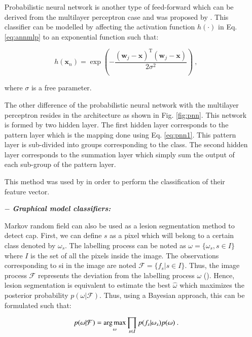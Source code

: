 \begin{enumerate}[leftmargin=*]
Probabilistic neural network is another type of feed-forward which can be derived from the multilayer perceptron case and was proposed by \cite{Specht1988}. This classifier can be modelled by affecting the activation function $h(\cdot)$ in Eq. \eqref{eq:annmlp} to an exponential function such that:

\begin{equation}
	h(\mathbf{x}_n) = \exp \left( - \frac{ (\mathbf{w}_j - \mathbf{x})^{\text{T}}(\mathbf{w}_j - \mathbf{x}) }{2\sigma^2} \right) \ ,
	\label{eq:pnn1}
\end{equation}

\noindent where $\sigma$ is a free parameter.

The other difference of the probabilistic neural network with the multilayer perceptron resides in the architecture as shown in Fig. \ref{fig:pnn}. This network is formed by two hidden layer. The first hidden layer corresponds to the pattern layer which is the mapping done using Eq. \eqref{eq:pnn1}. This pattern layer is sub-divided into groups corresponding to the class. The second hidden layer corresponds to the summation layer which simply sum the output of each sub-group of the pattern layer.

This method was used  by \cite{Ampeliotis2007,Ampeliotis2008,Viswanath2011} in order to perform the classification of their feature vector.

\item[$-$] \textbf{\textit{Graphical model classifiers:}}

Markov random field can also be used as a lesion segmentation method to detect \ac{cap}. First, we can define $s$ as a pixel which will belong to a certain class denoted by $\omega_s$. The labelling process can be noted as $\omega = \{\omega_s, s \in I\}$ where $I$ is the set of all the pixels inside the image. The observations corresponding to \ac{si} in the image are noted $\mathcal{F} = \{ f_s | s \in I \}$. Thus, the image process $\mathcal{F}$ represents the deviation from the labelling process $\omega$ (\cite{Kato2001}). Hence, lesion segmentation is equivalent to estimate the best $\hat{\omega}$ which maximizes the posterior probability $p(\omega|\mathcal{F})$. Thus, using a Bayesian approach, this can be formulated such that:

\begin{equation}
	p(\omega|\mathcal{F}) = \operatorname*{arg\,max}_{\omega} \prod_{s \in I} p(f_s | \omega_s) p(\omega) \ .
	\label{eq:mrf1}
\end{equation}


\end{enumerate}
